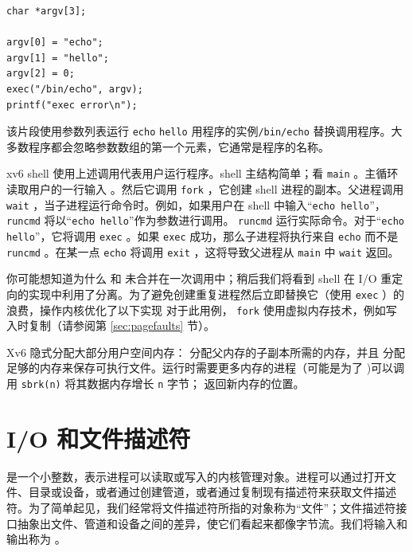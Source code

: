 \begin{lstlisting}[]
char *argv[3];

argv[0] = "echo";
argv[1] = "hello";
argv[2] = 0;
exec("/bin/echo", argv);
printf("exec error\n");
\end{lstlisting}
	
	该片段使用参数列表运行
    \lstinline{echo}   
    \lstinline{hello}  用程序的实例\lstinline{/bin/echo} 替换调用程序。大多数程序都会忽略参数数组的第一个元素，它通常是程序的名称。  

xv6 shell 使用上述调用代表用户运行程序。shell 主结构简单；看
    \lstinline{main}   
        。主循环读取用户的一行输入
        。然后它调用
    \lstinline{fork}    ，它创建 shell 进程的副本。父进程调用
    \lstinline{wait}   ，当子进程运行命令时。例如，如果用户在 shell 中输入“\lstinline{echo hello}”，
    \lstinline{runcmd}    将以“\lstinline{echo hello}”作为参数进行调用。
    \lstinline{runcmd}   
         运行实际命令。对于“\lstinline{echo hello}”，它将调用
    \lstinline{exec}   
        。如果
    \lstinline{exec}    成功，那么子进程将执行来自
    \lstinline{echo}    而不是
    \lstinline{runcmd}    。在某一点
    \lstinline{echo}    将调用
    \lstinline{exit}    ，这将导致父进程从
      \lstinline{main}   
        中
    \lstinline{wait} 返回。  

你可能想知道为什么
        和
        未合并在一次调用中；稍后我们将看到 shell 在 I/O 重定向的实现中利用了分离。为了避免创建重复进程然后立即替换它（使用    \lstinline{exec}    ）的浪费，操作内核优化了以下实现
 对于此用例，   \lstinline{fork}    使用虚拟内存技术，例如写入时复制（请参阅第    \ref{sec:pagefaults}    节）。  

Xv6 隐式分配大部分用户空间内存：
        分配父内存的子副本所需的内存，并且
        分配足够的内存来保存可执行文件。运行时需要更多内存的进程（可能是为了
        )可以调用
    \lstinline{sbrk(n)}    将其数据内存增长
    \lstinline{n}    字节；
        返回新内存的位置。
    \section{I/O 和文件描述符  }     


        是一个小整数，表示进程可以读取或写入的内核管理对象。进程可以通过打开文件、目录或设备，或者通过创建管道，或者通过复制现有描述符来获取文件描述符。为了简单起见，我们经常将文件描述符所指的对象称为“文件”；文件描述符接口抽象出文件、管道和设备之间的差异，使它们看起来都像字节流。我们将输入和输出称为        。  

